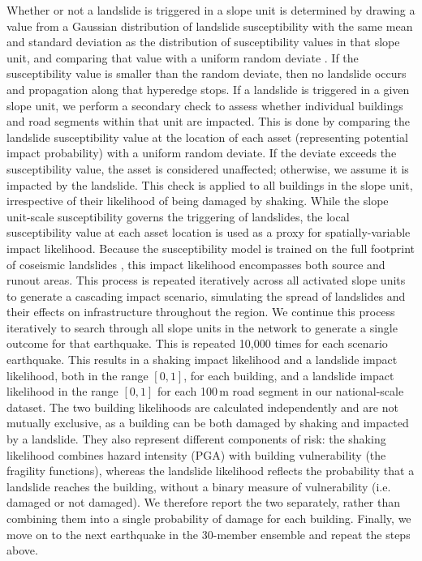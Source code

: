 \documentclass[nhess, manuscript]{copernicus}
\begin{document}
Whether or not a landslide is triggered in a slope unit is determined by drawing a value from a Gaussian distribution of landslide susceptibility with the same mean and standard deviation as the distribution of susceptibility values in that slope unit, and comparing that value with a uniform random deviate \citep{Dunant2025}. If the susceptibility value is smaller than the random deviate, then no landslide occurs and propagation along that hyperedge stops. If a landslide is triggered in a given slope unit, we perform a secondary check to assess whether individual buildings and road segments within that unit are impacted. This is done by comparing the landslide susceptibility value at the location of each asset (representing potential impact probability) with a uniform random deviate. If the deviate exceeds the susceptibility value, the asset is considered unaffected; otherwise, we assume it is impacted by the landslide. This check is applied to all buildings in the slope unit, irrespective of their likelihood of being damaged by shaking. While the slope unit-scale susceptibility governs the triggering of landslides, the local susceptibility value at each asset location is used as a proxy for spatially-variable impact likelihood. Because the susceptibility model is trained on the full footprint of coseismic landslides \citep{Kincey2021}, this impact likelihood encompasses both source and runout areas. This process is repeated iteratively across all activated slope units to generate a cascading impact scenario, simulating the spread of landslides and their effects on infrastructure throughout the region. We continue this process iteratively to search through all slope units in the network to generate a single outcome for that earthquake. This is repeated 10,000 times for each scenario earthquake. This results in a shaking impact likelihood and a landslide impact likelihood, both in the range $[0,1]$, for each building, and a landslide impact likelihood in the range $[0,1]$ for each 100\,\unit{m} road segment in our national-scale dataset. The two building likelihoods are calculated independently and are not mutually exclusive, as a building can be both damaged by shaking and impacted by a landslide. They also represent different components of risk: the shaking likelihood combines hazard intensity (PGA) with building vulnerability (the fragility functions), whereas the landslide likelihood reflects the probability that a landslide reaches the building, without a binary measure of vulnerability (i.e. damaged or not damaged). We therefore report the two separately, rather than combining them into a single probability of damage for each building. Finally, we move on to the next earthquake in the 30-member ensemble and repeat the steps above.
\end{document}
